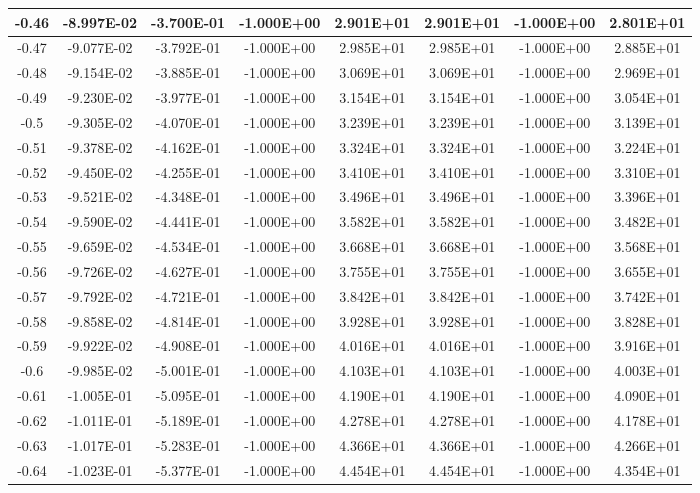 \documentclass{article}
\begin{document}
\begin{center}
\begin{longtable}{|c|c|c|c|c|c|c|c|}
-0.46 & -8.997E-02 & -3.700E-01 & -1.000E+00 & 2.901E+01 & 2.901E+01 & -1.000E+00 & 2.801E+01 \\ \hline
-0.47 & -9.077E-02 & -3.792E-01 & -1.000E+00 & 2.985E+01 & 2.985E+01 & -1.000E+00 & 2.885E+01 \\ \hline
-0.48 & -9.154E-02 & -3.885E-01 & -1.000E+00 & 3.069E+01 & 3.069E+01 & -1.000E+00 & 2.969E+01 \\ \hline
-0.49 & -9.230E-02 & -3.977E-01 & -1.000E+00 & 3.154E+01 & 3.154E+01 & -1.000E+00 & 3.054E+01 \\ \hline
-0.5 & -9.305E-02 & -4.070E-01 & -1.000E+00 & 3.239E+01 & 3.239E+01 & -1.000E+00 & 3.139E+01 \\ \hline
-0.51 & -9.378E-02 & -4.162E-01 & -1.000E+00 & 3.324E+01 & 3.324E+01 & -1.000E+00 & 3.224E+01 \\ \hline
-0.52 & -9.450E-02 & -4.255E-01 & -1.000E+00 & 3.410E+01 & 3.410E+01 & -1.000E+00 & 3.310E+01 \\ \hline
-0.53 & -9.521E-02 & -4.348E-01 & -1.000E+00 & 3.496E+01 & 3.496E+01 & -1.000E+00 & 3.396E+01 \\ \hline
-0.54 & -9.590E-02 & -4.441E-01 & -1.000E+00 & 3.582E+01 & 3.582E+01 & -1.000E+00 & 3.482E+01 \\ \hline
-0.55 & -9.659E-02 & -4.534E-01 & -1.000E+00 & 3.668E+01 & 3.668E+01 & -1.000E+00 & 3.568E+01 \\ \hline
-0.56 & -9.726E-02 & -4.627E-01 & -1.000E+00 & 3.755E+01 & 3.755E+01 & -1.000E+00 & 3.655E+01 \\ \hline
-0.57 & -9.792E-02 & -4.721E-01 & -1.000E+00 & 3.842E+01 & 3.842E+01 & -1.000E+00 & 3.742E+01 \\ \hline
-0.58 & -9.858E-02 & -4.814E-01 & -1.000E+00 & 3.928E+01 & 3.928E+01 & -1.000E+00 & 3.828E+01 \\ \hline
-0.59 & -9.922E-02 & -4.908E-01 & -1.000E+00 & 4.016E+01 & 4.016E+01 & -1.000E+00 & 3.916E+01 \\ \hline
-0.6 & -9.985E-02 & -5.001E-01 & -1.000E+00 & 4.103E+01 & 4.103E+01 & -1.000E+00 & 4.003E+01 \\ \hline
-0.61 & -1.005E-01 & -5.095E-01 & -1.000E+00 & 4.190E+01 & 4.190E+01 & -1.000E+00 & 4.090E+01 \\ \hline
-0.62 & -1.011E-01 & -5.189E-01 & -1.000E+00 & 4.278E+01 & 4.278E+01 & -1.000E+00 & 4.178E+01 \\ \hline
-0.63 & -1.017E-01 & -5.283E-01 & -1.000E+00 & 4.366E+01 & 4.366E+01 & -1.000E+00 & 4.266E+01 \\ \hline
-0.64 & -1.023E-01 & -5.377E-01 & -1.000E+00 & 4.454E+01 & 4.454E+01 & -1.000E+00 & 4.354E+01 \\ \hline

\end{longtable}
\end{center}
\end{document}
